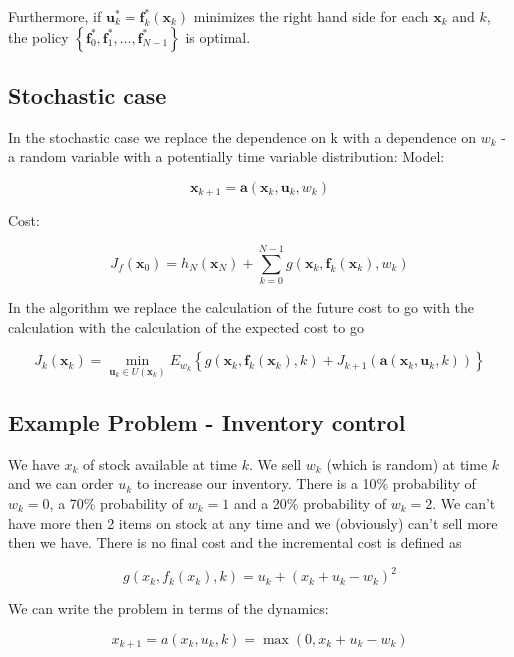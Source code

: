\documentclass[twoside]{article}
\begin{document}
Furthermore, if $\boldsymbol{u}_{k}^{*} = \boldsymbol{f}_{k}^{*}(\boldsymbol{x}_{k})$ minimizes the right hand side for each $\boldsymbol{x}_{k}$ and $k$, the policy $\left\{\boldsymbol{f}_{0}^{*}, \boldsymbol{f}_{1}^{*}, \ldots, \boldsymbol{f}_{N-1}^{*}\right\}$ is optimal.

\subsection{Stochastic case}
In the stochastic case we replace the dependence on k with a dependence on $w_k$ - a random variable with a potentially time variable distribution:
Model:

$$ 
\boldsymbol{x}_{k+1}=\boldsymbol{a}\left(\boldsymbol{x}_{k}, \boldsymbol{u}_{k}, w_{k}\right)
 $$

Cost:

$$ 
J_{f}\left(\boldsymbol{x}_{0}\right)=h_{N}\left(\boldsymbol{x}_{N}\right)+\sum_{k=0}^{N-1} g\left(\boldsymbol{x}_{k}, \boldsymbol{f}_{k}\left(\boldsymbol{x}_{k}\right), w_{k}\right)
 $$

In the algorithm we replace the calculation of the future cost to go with the calculation with the calculation of the expected cost to go

$$ 
J_{k}\left(\boldsymbol{x}_{k}\right)=\min _{\boldsymbol{u}_{k} \in U\left(\boldsymbol{x}_{k}\right)} E_{w_{k}}\left\{g\left(\boldsymbol{x}_{k}, \boldsymbol{f}_{k}\left(\boldsymbol{x}_{k}\right), k\right)+J_{k+1}\left(\boldsymbol{a}\left(\boldsymbol{x}_{k}, \boldsymbol{u}_{k}, k\right)\right)\right\}
 $$

\subsection{Example Problem - Inventory control}
We have $x_k$ of stock available at time $k$. We sell $w_k$ (which is random) at time $k$ and we can order $u_k$ to increase our inventory. There is a 10\% probability of $w_k = 0$, a 70\% probability of $w_k = 1$ and a 20\% probability of $w_k = 2$. We can’t have more then 2 items on stock at any time and we (obviously) can’t sell more then we have. There is no final cost and the incremental cost is defined as

$$ 
g\left(x_{k}, f_{k}\left(x_{k}\right), k\right)=u_{k}+\left(x_{k}+u_{k}-w_{k}\right)^{2}
 $$

We can write the problem in terms of the dynamics:

$$ 
x_{k+1}=a\left(x_{k}, u_{k}, k\right)=\max \left(0, x_{k}+u_{k}-w_{k}\right)
 $$
\end{document}

